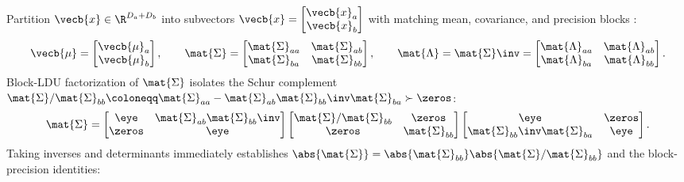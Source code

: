 \documentclass[../../../../master.tex]{subfiles}
\begin{document}
\begin{coremath}
Partition $\vecb{x} \in \R^{D_a + D_b}$ into subvectors $\vecb{x} = \begin{bmatrix}\vecb{x}_a \\ \vecb{x}_b\end{bmatrix}$ with matching mean, covariance, and precision blocks   :
\begin{equation}\label{eq:probdist:block_sig_lam}
  \vecb{\mu} = \begin{bmatrix}\vecb{\mu}_a \\ \vecb{\mu}_b\end{bmatrix}, \qquad
  \mat{\Sigma} = \begin{bmatrix}\mat{\Sigma}_{aa} & \mat{\Sigma}_{ab} \\ \mat{\Sigma}_{ba} & \mat{\Sigma}_{bb}\end{bmatrix}, \qquad
  \mat{\Lambda} = \mat{\Sigma}\inv = \begin{bmatrix}\mat{\Lambda}_{aa} & \mat{\Lambda}_{ab} \\ \mat{\Lambda}_{ba} & \mat{\Lambda}_{bb}\end{bmatrix}.
\end{equation}
Block-LDU factorization of $\mat{\Sigma}$ isolates the Schur complement $\mat{\Sigma}/\mat{\Sigma}_{bb} \coloneqq \mat{\Sigma}_{aa} - \mat{\Sigma}_{ab}\mat{\Sigma}_{bb}\inv\mat{\Sigma}_{ba} \succ \zeros$:
\begin{equation}\label{eq:probdist:schur_ldu}
  \mat{\Sigma}
  = \begin{bmatrix}\eye & \mat{\Sigma}_{ab}\mat{\Sigma}_{bb}\inv \\ \zeros & \eye\end{bmatrix}
    \begin{bmatrix}\mat{\Sigma}/\mat{\Sigma}_{bb} & \zeros \\ \zeros & \mat{\Sigma}_{bb}\end{bmatrix}
    \begin{bmatrix}\eye & \zeros \\ \mat{\Sigma}_{bb}\inv\mat{\Sigma}_{ba} & \eye\end{bmatrix}.
\end{equation}
Taking inverses and determinants immediately establishes $\abs{\mat{\Sigma}} = \abs{\mat{\Sigma}_{bb}}\abs{\mat{\Sigma}/\mat{\Sigma}_{bb}}$ and the block-precision identities:

\end{coremath}
\end{document}

